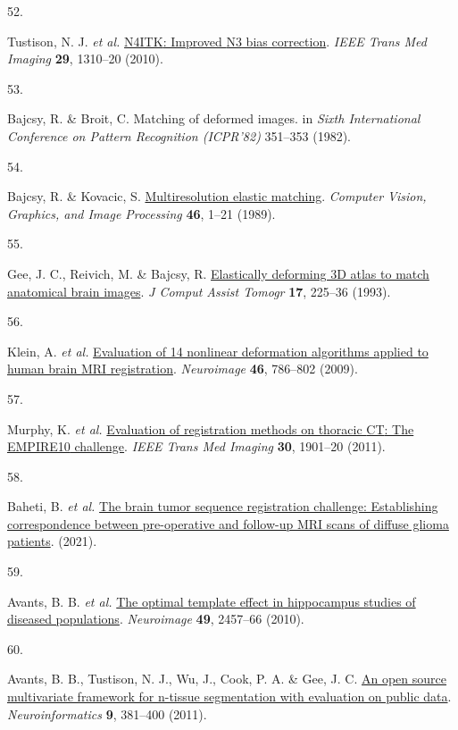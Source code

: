 \documentclass[
  12pt,
]{article}
\newlength{\cslhangindent}
\newlength{\csllabelwidth}
\newenvironment{CSLReferences}[2] %
 {\begin{list}{}{%
  \setlength{\itemindent}{0pt}
  \setlength{\leftmargin}{0pt}
  \setlength{\parsep}{0pt}
  \ifodd #1
   \setlength{\leftmargin}{\cslhangindent}
   \setlength{\itemindent}{-1\cslhangindent}
  \fi
  \setlength{\itemsep}{#2\baselineskip}}}
 {\end{list}}
\newcommand{\CSLLeftMargin}[1]{\parbox[t]{\csllabelwidth}{\strut#1\strut}}
\newcommand{\CSLRightInline}[1]{\parbox[t]{\linewidth - \csllabelwidth}{\strut#1\strut}}
\begin{document}
\begin{CSLReferences}{0}{0}
\CSLLeftMargin{52. }%
\CSLRightInline{Tustison, N. J. \emph{et al.}
\href{https://doi.org/10.1109/TMI.2010.2046908}{{N4ITK}: Improved {N3}
bias correction}. \emph{IEEE Trans Med Imaging} \textbf{29}, 1310--20
(2010).}

\CSLLeftMargin{53. }%
\CSLRightInline{Bajcsy, R. \& Broit, C. Matching of deformed images. in
\emph{{S}ixth {I}nternational {C}onference on {P}attern {R}ecognition
({ICPR}'82)} 351--353 (1982).}

\CSLLeftMargin{54. }%
\CSLRightInline{Bajcsy, R. \& Kovacic, S.
\href{https://doi.org/10.1016/S0734-189X(89)80014-3}{Multiresolution
elastic matching}. \emph{Computer Vision, Graphics, and Image
Processing} \textbf{46}, 1--21 (1989).}

\CSLLeftMargin{55. }%
\CSLRightInline{Gee, J. C., Reivich, M. \& Bajcsy, R.
\href{https://www.ncbi.nlm.nih.gov/pubmed/8454749}{Elastically deforming
3D atlas to match anatomical brain images}. \emph{J Comput Assist
Tomogr} \textbf{17}, 225--36 (1993).}

\CSLLeftMargin{56. }%
\CSLRightInline{Klein, A. \emph{et al.}
\href{https://doi.org/10.1016/j.neuroimage.2008.12.037}{Evaluation of 14
nonlinear deformation algorithms applied to human brain {MRI}
registration}. \emph{Neuroimage} \textbf{46}, 786--802 (2009).}

\CSLLeftMargin{57. }%
\CSLRightInline{Murphy, K. \emph{et al.}
\href{https://doi.org/10.1109/TMI.2011.2158349}{Evaluation of
registration methods on thoracic {CT}: The {EMPIRE10} challenge}.
\emph{IEEE Trans Med Imaging} \textbf{30}, 1901--20 (2011).}

\CSLLeftMargin{58. }%
\CSLRightInline{Baheti, B. \emph{et al.}
\href{https://arxiv.org/abs/2112.06979}{The brain tumor sequence
registration challenge: Establishing correspondence between
pre-operative and follow-up MRI scans of diffuse glioma patients}.
(2021).}

\CSLLeftMargin{59. }%
\CSLRightInline{Avants, B. B. \emph{et al.}
\href{https://doi.org/10.1016/j.neuroimage.2009.09.062}{The optimal
template effect in hippocampus studies of diseased populations}.
\emph{Neuroimage} \textbf{49}, 2457--66 (2010).}

\CSLLeftMargin{60. }%
\CSLRightInline{Avants, B. B., Tustison, N. J., Wu, J., Cook, P. A. \&
Gee, J. C. \href{https://doi.org/10.1007/s12021-011-9109-y}{An open
source multivariate framework for n-tissue segmentation with evaluation
on public data}. \emph{Neuroinformatics} \textbf{9}, 381--400 (2011).}


\end{CSLReferences}
\end{document}
